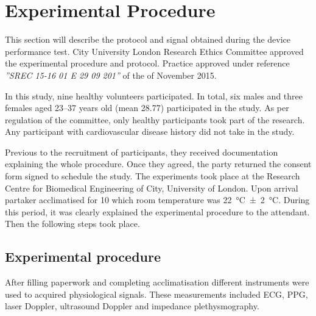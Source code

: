 
\chapter{Experimental Procedure}  %

\ifpdf
    \graphicspath{{Chapter4/Figs/Raster/}{Chapter4/Figs/PDF/}{Chapter4/Figs/}}
\else
    \graphicspath{{Chapter4/Figs/Vector/}{Chapter4/Figs/}}
\fi


This section will describe the protocol and signal obtained during the device performance test. City University London Research Ethics Committee approved the experimental procedure and protocol. Practice approved under reference \textit{''SREC 15-16 01 E 29 09 201''} of the  of November 2015. 

In this study, nine healthy volunteers participated. In total, six males and three females aged \numrange{23}{37} years old (mean 28.77) participated in the study. As per regulation of the committee, only healthy participants took part of the research. Any participant with cardiovascular disease history did not take in the study. 

Previous to the recruitment of participants, they received documentation explaining the whole procedure. Once they agreed, the party returned the consent form signed to schedule the study. The experiments took place at the Research Centre for Biomedical Engineering of City, University of London. Upon arrival partaker acclimatised for \SI{10}{\min} which room temperature was \SI{22}{\degreeCelsius}\SI{\pm 2}{\degreeCelsius}. During this period, it was clearly explained the experimental procedure to the attendant. Then the following steps took place.


\section{Experimental procedure} %
\label{section4.1}

After filling paperwork and completing acclimatisation different instruments were used to acquired physiological signals. These measurements included ECG, PPG, laser Doppler, ultrasound Doppler and impedance plethysmography. 


